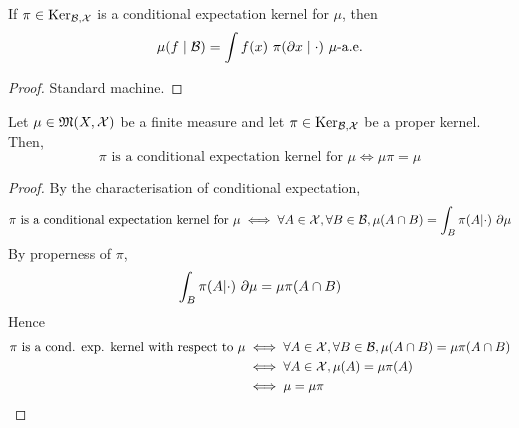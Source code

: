 \begin{lemma}
    \label{lem:cond-exp-proper-ker-integral}

    If $\pi \in \text{Ker}_{\mathcal B, \mathcal X}$ is a conditional expectation kernel for $\mu$, then
    $$\mu(f\mid \MCB) = \int f(x)\ \pi(\partial x\mid\cdot)\ \mu\text{-a.e.}$$
\end{lemma}
\begin{proof}

    Standard machine.
\end{proof}

\begin{lemma}
    \label{lem:cond-exp-proper-ker-bind}
    \leanok

    Let $\mu\in\mathfrak{M}(X,\mathcal X)$ be a finite measure and let $\pi\in\text{Ker}_{\mathcal B,\mathcal X}$ be a proper kernel. Then,
    $$\pi \text{ is a conditional expectation kernel for }\mu \iff \mu\pi = \mu$$
\end{lemma}
\begin{proof}
    \leanok

    By the characterisation of conditional expectation,
    $$\pi \text{ is a conditional expectation kernel for }\mu \iff \forall A \in \mathcal X, \forall B \in \mathcal B, \mu(A \cap B) = \int_B \pi(A|\cdot)\ \partial\mu$$
    By properness of $\pi$,
    $$\int_B \pi(A|\cdot)\ \partial\mu = \mu\pi(A \cap B)$$
    Hence
    \begin{align}
        \pi \text{ is a cond. exp. kernel with respect to }\mu
        & \iff \forall A \in \mathcal X, \forall B \in \mathcal B, \mu(A \cap B) = \mu\pi(A \cap B) \\
        & \iff \forall A \in \mathcal X, \mu(A) = \mu\pi(A) \\
        & \iff \mu = \mu\pi
    \end{align}
\end{proof}
